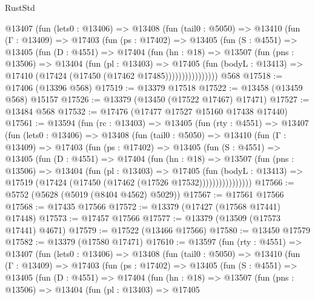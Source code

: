 \begin{lexlean}{RustStd}
\begin{coremodule}
        @13407
          (fun (lets0 : @13406) =>
          @13408
            (fun (tail0 : @5050) =>
            @13410
              (fun (Γ : @13409) =>
              @17403
                (fun (ps : @17402) =>
                @13405
                  (fun (S : @4551) =>
                  @13405
                    (fun (D : @4551) =>
                    @17404
                      (fun (hn : @18) =>
                      @13507
                        (fun (pns : @13506) =>
                        @13404
                          (fun (pl : @13403) =>
                          @17405
                            (fun (bodyL : @13413) =>
                            @17410 (@17424 (@17450 (@17462 @17485))))))))))))))))
    @568
@17518 := @17406 (@13396 @568)
@17519 := @13379 @17518
@17522 := @13458 (@13459 @568) @15157
@17526 := @13379 (@13450 (@17522 @17467) @17471)
@17527 := @13484 @568
@17532 := @17476 (@17477 @17527 @15160 @17438 @17440)
@17561 := @13594
    (fun (rc : @13403) =>
    @13405
      (fun (rty : @4551) =>
      @13407
        (fun (lets0 : @13406) =>
        @13408
          (fun (tail0 : @5050) =>
          @13410
            (fun (Γ : @13409) =>
            @17403
              (fun (ps : @17402) =>
              @13405
                (fun (S : @4551) =>
                @13405
                  (fun (D : @4551) =>
                  @17404
                    (fun (hn : @18) =>
                    @13507
                      (fun (pns : @13506) =>
                      @13404
                        (fun (pl : @13403) =>
                        @17405
                          (fun (bodyL : @13413) =>
                          @17519 (@17424 (@17450 (@17462 (@17526 @17532))))))))))))))))
@17566 := @5752 (@5628 (@5019 (@8404 @4562) @5029))
@17567 := @17561 @17566
@17568 := @17435 @17566
@17572 := @13379 (@17427 (@17568 @17441) @17448)
@17573 := @17457 @17566
@17577 := @13379 (@13509 (@17573 @17441) @4671)
@17579 := @17522 (@13466 @17566)
@17580 := @13450 @17579
@17582 := @13379 (@17580 @17471)
@17610 := @13597
    (fun (rty : @4551) =>
    @13407
      (fun (lets0 : @13406) =>
      @13408
        (fun (tail0 : @5050) =>
        @13410
          (fun (Γ : @13409) =>
          @17403
            (fun (ps : @17402) =>
            @13405
              (fun (S : @4551) =>
              @13405
                (fun (D : @4551) =>
                @17404
                  (fun (hn : @18) =>
                  @13507
                    (fun (pns : @13506) =>
                    @13404
                      (fun (pl : @13403) =>
                      @17405

\end{coremodule}
\end{lexlean}
